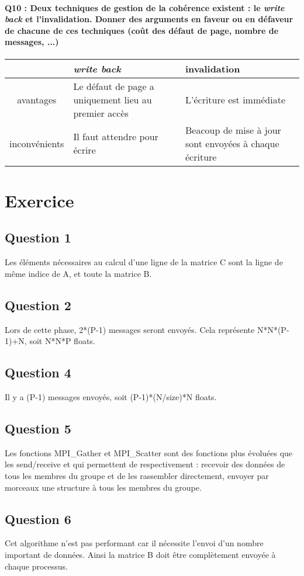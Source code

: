 \documentclass[a4paper]{article}
\begin{document}
\paragraph{Q10 : Deux techniques de gestion de la cohérence existent : le \textit{write back} et l'invalidation. Donner des arguments en faveur ou en défaveur de chacune de ces techniques (coût des défaut de page, nombre de messages, ...)\\}
\begin{tabular}{ | c | p{4.5cm} | p{4.5cm} | }
  \hline
  & \textit{write back} & invalidation  \\ \hline
  avantages & Le défaut de page a uniquement lieu au premier accès  & L'écriture est immédiate \\ \hline
  inconvénients & Il faut attendre pour écrire & Beacoup de mise à jour sont envoyées à chaque écriture \\ \hline
\end{tabular}

\section{Exercice}

\subsection{Question 1}
Les éléments nécessaires au calcul d'une ligne de la matrice C sont la ligne de même indice de A, et toute la matrice B.

\subsection{Question 2}
Lors de cette phase, 2*(P-1) messages seront envoyés. Cela représente N*N*(P-1)+N, soit N*N*P floats.

\subsection{Question 4}
Il y a (P-1) messages envoyés, soit (P-1)*(N/size)*N floats.

\subsection{Question 5}
Les fonctions MPI\_Gather et MPI\_Scatter sont des fonctions plus évoluées que les send/receive et qui permettent de respectivement : recevoir des données de tous les membres du groupe et de les rassembler directement, envoyer par morceaux une structure à tous les membres du groupe.

\subsection{Question 6}
Cet algorithme n'est pas performant car il nécessite l'envoi d'un nombre important de données. Ainsi la matrice B doit être complètement envoyée à chaque processus.


\end{document}
